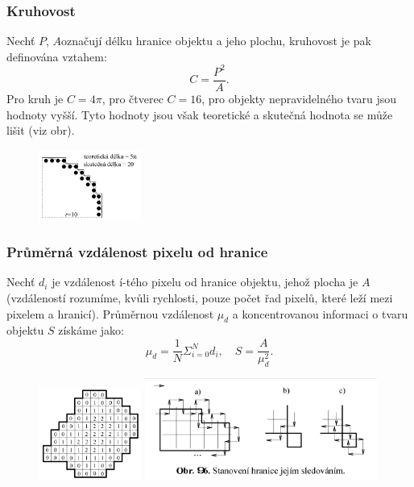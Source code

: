 \subsubsection{Kruhovost}
Nechť $ P $, $ A  $označují délku hranice objektu a jeho plochu, kruhovost je pak definována vztahem:
\begin{equation*}
C = \frac{P^2}{A}.
\end{equation*}
Pro kruh je $C = 4 \pi$, pro čtverec $C = 16$, pro objekty nepravidelného tvaru jsou hodnoty vyšší. Tyto hodnoty jsou však teoretické a skutečná hodnota se může lišit (viz obr).
\begin{figure}[H]
	\centering
	\includegraphics[width=0.3\textwidth]{assets/9_kruhovost}
\end{figure}

\subsubsection{Průměrná vzdálenost pixelu od hranice}
Nechť $d_i$ je vzdálenost í-tého pixelu od hranice objektu, jehož plocha je $A$ (vzdáleností rozumíme, kvůli rychlosti, pouze počet řad pixelů, které leží mezi pixelem a hranicí). Průměrnou vzdálenost $\mu_d$ a koncentrovanou informaci o tvaru objektu $S$ získáme jako:
\begin{equation*}
\mu_d = \frac{1}{N} \Sigma^N_{i = 0}d_i, \quad S = \frac{A}{\mu_d^2}.
\end{equation*}

\begin{figure}[H]
	\centering
	\includegraphics[width=0.3\textwidth]{assets/9_px_vzdalenost}
	\includegraphics[width=0.68\textwidth]{assets/9_stanoveni_hranice}
\end{figure}

